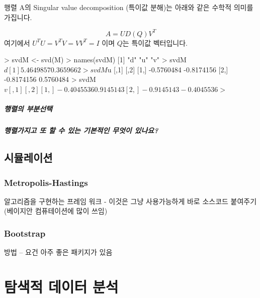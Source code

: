 \documentclass{report}
\begin{document}
행렬 A의 Singular value decomposition (특이값 분해)는 아래와 같은 수학적 의미를 가집니다. 

\begin{equation}
A = U D(Q) V^T
\end{equation}
%
여기에서 $ U^T U = V^T V = VV^T = I $ 이며 $Q$는 특이값 벡터입니다. 

\begin{Schunk}
\begin{Soutput}
> svdM <- svd(M)
> names(svdM)
[1] "d" "u" "v"
> svdM$d
[1] 5.4649857 0.3659662
> svdM$u
           [,1]       [,2]
[1,] -0.5760484 -0.8174156
[2,] -0.8174156  0.5760484
> svdM$v
           [,1]       [,2]
[1,] -0.4045536  0.9145143
[2,] -0.9145143 -0.4045536
> $
\end{Soutput}
\end{Schunk}

\paragraph{행렬의 부분선택}

\paragraph{행렬가지고 또 할 수 있는 기본적인 무엇이 있나요?}


\section{시뮬레이션}
\subsection{Metropolis-Hastings} 알고리즘을 구현하는 프레임 워크 - 이것은 그냥 사용가능하게 바로 소스코드 붙여주기 (베이지안 컴퓨테이션에 많이 쓰임)

\subsection{Bootstrap} 
방법 -- 요건 아주 좋은 패키지가 있음 


%
%
%

\chapter{탐색적 데이터 분석}
\end{document}
